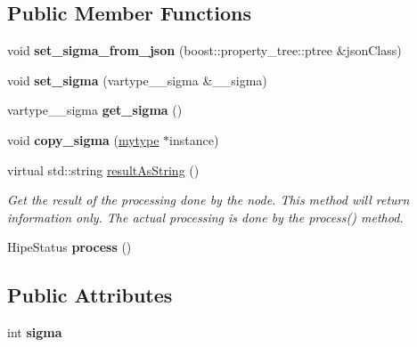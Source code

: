 \subsection*{Public Member Functions}
\begin{DoxyCompactItemize}
\item 
\mbox{\label{classfilter_1_1algos_1_1_gaussian_ad6560679874af193ff2c27592c60dcd8}} 
void {\bfseries set\+\_\+sigma\+\_\+from\+\_\+json} (boost\+::property\+\_\+tree\+::ptree \&json\+Class)
\item 
\mbox{\label{classfilter_1_1algos_1_1_gaussian_ab248437e17b0ba05f8a51797c3e15143}} 
void {\bfseries set\+\_\+sigma} (vartype\+\_\+\+\_\+sigma \&\+\_\+\+\_\+sigma)
\item 
\mbox{\label{classfilter_1_1algos_1_1_gaussian_a4e009d7489028c92cdf4a7c628fd6941}} 
vartype\+\_\+\+\_\+sigma {\bfseries get\+\_\+sigma} ()
\item 
\mbox{\label{classfilter_1_1algos_1_1_gaussian_a8b888f2c9fe5ea129c4ffeff46097d24}} 
void {\bfseries copy\+\_\+sigma} (\hyperlink{classfilter_1_1algos_1_1_gaussian}{mytype} $\ast$instance)
\item 
virtual std\+::string \hyperlink{classfilter_1_1algos_1_1_gaussian_a5f2ba86fa61807781b46fe321e435c29}{result\+As\+String} ()
\begin{DoxyCompactList}\small\item\em Get the result of the processing done by the node. This method will return information only. The actual processing is done by the process() method. \end{DoxyCompactList}\item 
\mbox{\label{classfilter_1_1algos_1_1_gaussian_ae7670cd03d12db1be0183ef0f37e1ba9}} 
Hipe\+Status {\bfseries process} ()
\end{DoxyCompactItemize}
\subsection*{Public Attributes}
\begin{DoxyCompactItemize}
\item 
\mbox{\label{classfilter_1_1algos_1_1_gaussian_a79118061fdbbe44108324c68af3a389d}} 
int {\bfseries sigma}
\end{DoxyCompactItemize}
